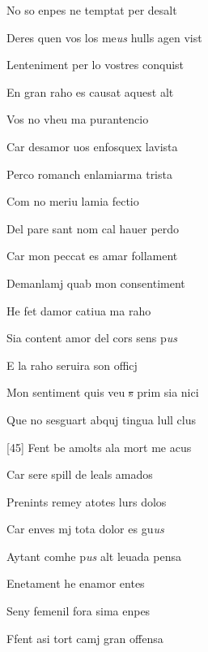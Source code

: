 \documentclass[12pt]{article}
\begin{document}
\begin{estrofa}

 No so enpes ne temptat per desalt

 Deres quen vos los me\textit{us} hulls agen vist

 Lenteniment per lo vostres conquist

 En gran raho es causat aquest alt

 Vos no vheu ma purantencio

 Car desamor uos enfosquex lavista

 Perco romanch enlamiarma trista

 Com no meriu lamia fectio

\end{estrofa}



\begin{estrofa}

 Del pare sant nom cal hauer perdo

 Car mon peccat es amar follament

 Demanlamj quab mon consentiment

 He fet damor catiua ma raho

 Sia content amor del cors sens p\textit{us}

 E la raho seruira son officj

 Mon sentiment quis veu \sout{s} prim sia nici

 Que no sesguart abquj tingua lull clus

\end{estrofa}



\begin{estrofa}

 [45] Fent be amolts ala mort me acus

 Car sere spill de leals amados

 Prenints remey atotes lurs dolos

 Car enves mj tota dolor es gu\textit{us}

 Aytant comhe p\textit{us} alt leuada pensa

 Enetament he enamor entes

 Seny femenil fora sima enpes

 Ffent asi tort camj gran offensa

\end{estrofa}
\end{document}
